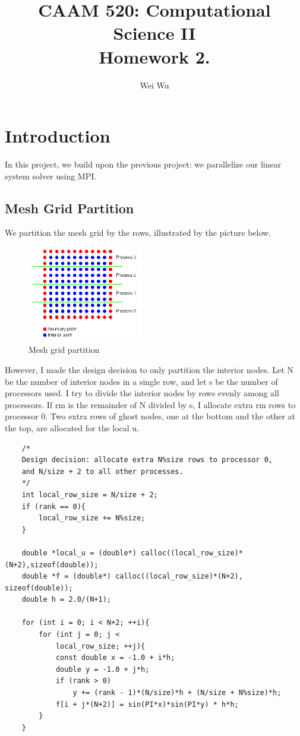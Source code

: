 \documentclass{amsart} %
\title{CAAM 520: Computational Science II \\
Homework 2.}
\author{Wei Wu}
\begin{document}

\maketitle

\section{Introduction} 

In this project, we build upon the previous project: we parallelize our linear system solver using MPI. 

\subsection{Mesh Grid Partition}

We partition the mesh grid by the rows, illustrated by the picture below. 

\begin{figure}[!htb]
  \includegraphics[width=50mm]{grid.jpg}
  \caption{Mesh grid partition}
  \label{fig:boat1}
\end{figure}
\FloatBarrier

However, I made the design decision to only partition the interior nodes.  Let N be the number of interior nodes in a single row, and let s be the number of processors used. I try to divide the interior nodes by rows evenly among all processors. If rm is the remainder of N divided by s, I allocate extra rm rows to processor 0. Two extra rows of ghost nodes, one at the bottom and the other at the top, are allocated for the local u.   

\begin{lstlisting}
	/* 
	Design decision: allocate extra N%size rows to processor 0,
	and N/size + 2 to all other processes. 
	*/  
	int local_row_size = N/size + 2;
	if (rank == 0){
		local_row_size += N%size;
	}
	
	double *local_u = (double*) calloc((local_row_size)*(N+2),sizeof(double));
	double *f = (double*) calloc((local_row_size)*(N+2), sizeof(double));
	double h = 2.0/(N+1);
	
	for (int i = 0; i < N+2; ++i){
		for (int j = 0; j <
			local_row_size; ++j){
			const double x = -1.0 + i*h;
			double y = -1.0 + j*h;
			if (rank > 0)
				y += (rank - 1)*(N/size)*h + (N/size + N%size)*h;
			f[i + j*(N+2)] = sin(PI*x)*sin(PI*y) * h*h;
		}
	}
\end{lstlisting}
\end{document}
